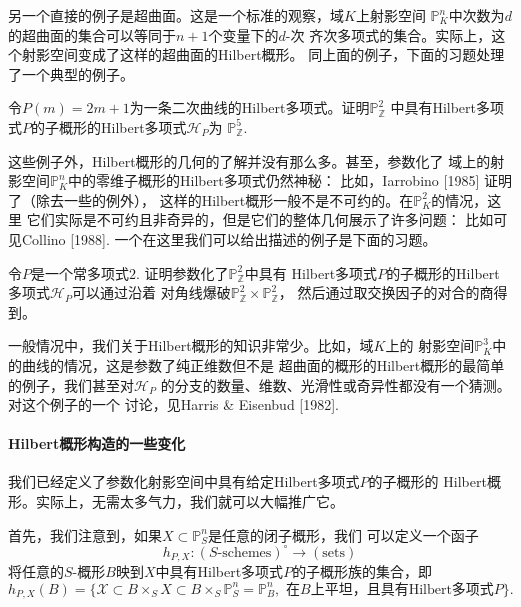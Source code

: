 另一个直接的例子是超曲面。这是一个标准的观察，域$K$上射影空间
$\mathbb P_K^n$中次数为$d$的超曲面的集合可以等同于$n+1$个变量下的$d$-次
齐次多项式的集合。实际上，这个射影空间变成了这样的超曲面的Hilbert概形。
同上面的例子，下面的习题处理了一个典型的例子。


\begin{exe}\label{exe:6.24}
令$P(m)=2m+1$为一条二次曲线的Hilbert多项式。证明$\mathbb P_{\mathbb Z}^2$
中具有Hilbert多项式$P$的子概形的Hilbert多项式$\mathscr H_P$为
$\mathbb P_{\mathbb Z}^5$.
\end{exe}

这些例子外，Hilbert概形的几何的了解并没有那么多。甚至，参数化了
域上的射影空间$\mathbb P_K^n$中的零维子概形的Hilbert多项式仍然神秘：
比如，Iarrobino [1985] 证明了（除去一些\naive 的例外），
这样的Hilbert概形一般不是不可约的。在$\mathbb P_K^2$的情况，这里
它们实际是不可约且非奇异的，但是它们的整体几何展示了许多问题：
比如可见Collino [1988]. 一个在这里我们可以给出描述的例子是下面的习题。

\begin{exe}\label{exe:6.25}
令$P$是一个常多项式$2$. 证明参数化了$\mathbb P_{\mathbb Z}^2$中具有
Hilbert多项式$P$的子概形的Hilbert多项式$\mathscr H_P$可以通过沿着
对角线爆破$\mathbb P_{\mathbb Z}^2\times \mathbb P_{\mathbb Z}^2$，
然后通过取交换因子的对合的商得到。\nottran
\end{exe}

一般情况中，我们关于Hilbert概形的知识非常少。比如，域$K$上的
射影空间$\mathbb P_K^3$中的曲线的情况，这是参数了纯正维数但不是
超曲面的概形的Hilbert概形的最简单的例子，我们甚至对$\mathscr H_P$
的分支的数量、维数、光滑性或奇异性都没有一个猜测。对这个例子的一个
讨论，见Harris \& Eisenbud [1982].

\paragraph*{Hilbert概形构造的一些变化}
我们已经定义了参数化射影空间中具有给定Hilbert多项式$P$的子概形的
Hilbert概形。实际上，无需太多气力，我们就可以大幅推广它。

首先，我们注意到，如果$X\subset \mathbb P_S^n$是任意的闭子概形，我们
可以定义一个函子
\[
    h_{P,X}:(\text{$S$-schemes})^\circ \to (\text{sets})    
\]
将任意的$S$-概形$B$映到$X$中具有Hilbert多项式$P$的子概形族的集合，即
\[
    h_{P,X}(B)=\{\mathscr{X} \subset B \times_{S} X \subset B 
    \times_{S} \mathbb{P}_{S}^{n}=\mathbb{P}_{B}^{n}, 
    \text{ 在$B$上平坦，且具有Hilbert多项式$P$}
    \}.
\]

